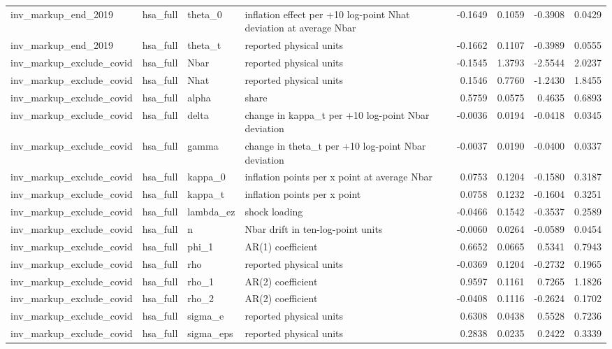 \begin{tabular}{llllrrrr}
inv\_markup\_end\_2019 & hsa\_full & theta\_0 & inflation effect per +10 log-point Nhat deviation at average Nbar & -0.1649 & 0.1059 & -0.3908 & 0.0429 \\
inv\_markup\_end\_2019 & hsa\_full & theta\_t & reported physical units & -0.1662 & 0.1107 & -0.3989 & 0.0555 \\
inv\_markup\_exclude\_covid & hsa\_full & Nbar & reported physical units & -0.1545 & 1.3793 & -2.5544 & 2.0237 \\
inv\_markup\_exclude\_covid & hsa\_full & Nhat & reported physical units & 0.1546 & 0.7760 & -1.2430 & 1.8455 \\
inv\_markup\_exclude\_covid & hsa\_full & alpha & share & 0.5759 & 0.0575 & 0.4635 & 0.6893 \\
inv\_markup\_exclude\_covid & hsa\_full & delta & change in kappa\_t per +10 log-point Nbar deviation & -0.0036 & 0.0194 & -0.0418 & 0.0345 \\
inv\_markup\_exclude\_covid & hsa\_full & gamma & change in theta\_t per +10 log-point Nbar deviation & -0.0037 & 0.0190 & -0.0400 & 0.0337 \\
inv\_markup\_exclude\_covid & hsa\_full & kappa\_0 & inflation points per x point at average Nbar & 0.0753 & 0.1204 & -0.1580 & 0.3187 \\
inv\_markup\_exclude\_covid & hsa\_full & kappa\_t & inflation points per x point & 0.0758 & 0.1232 & -0.1604 & 0.3251 \\
inv\_markup\_exclude\_covid & hsa\_full & lambda\_ez & shock loading & -0.0466 & 0.1542 & -0.3537 & 0.2589 \\
inv\_markup\_exclude\_covid & hsa\_full & n & Nbar drift in ten-log-point units & -0.0060 & 0.0264 & -0.0589 & 0.0454 \\
inv\_markup\_exclude\_covid & hsa\_full & phi\_1 & AR(1) coefficient & 0.6652 & 0.0665 & 0.5341 & 0.7943 \\
inv\_markup\_exclude\_covid & hsa\_full & rho & reported physical units & -0.0369 & 0.1204 & -0.2732 & 0.1965 \\
inv\_markup\_exclude\_covid & hsa\_full & rho\_1 & AR(2) coefficient & 0.9597 & 0.1161 & 0.7265 & 1.1826 \\
inv\_markup\_exclude\_covid & hsa\_full & rho\_2 & AR(2) coefficient & -0.0408 & 0.1116 & -0.2624 & 0.1702 \\
inv\_markup\_exclude\_covid & hsa\_full & sigma\_e & reported physical units & 0.6308 & 0.0438 & 0.5528 & 0.7236 \\
inv\_markup\_exclude\_covid & hsa\_full & sigma\_eps & reported physical units & 0.2838 & 0.0235 & 0.2422 & 0.3339 \\

\end{tabular}
